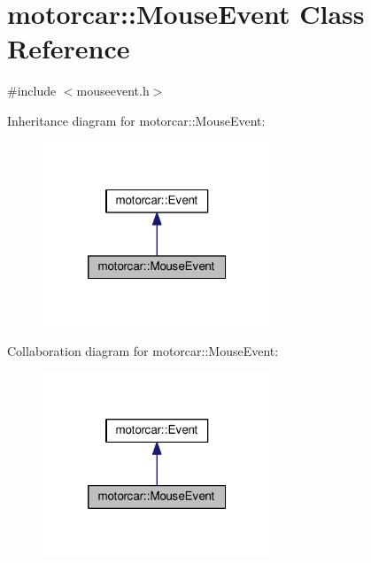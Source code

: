 \hypertarget{classmotorcar_1_1MouseEvent}{\section{motorcar\-:\-:Mouse\-Event Class Reference}
\label{classmotorcar_1_1MouseEvent}
}


{\ttfamily \#include $<$mouseevent.\-h$>$}



Inheritance diagram for motorcar\-:\-:Mouse\-Event\-:
\nopagebreak
\begin{figure}[H]
\begin{center}
\leavevmode
\includegraphics[width=194pt]{classmotorcar_1_1MouseEvent__inherit__graph}
\end{center}
\end{figure}


Collaboration diagram for motorcar\-:\-:Mouse\-Event\-:
\nopagebreak
\begin{figure}[H]
\begin{center}
\leavevmode
\includegraphics[width=194pt]{classmotorcar_1_1MouseEvent__coll__graph}
\end{center}
\end{figure}
